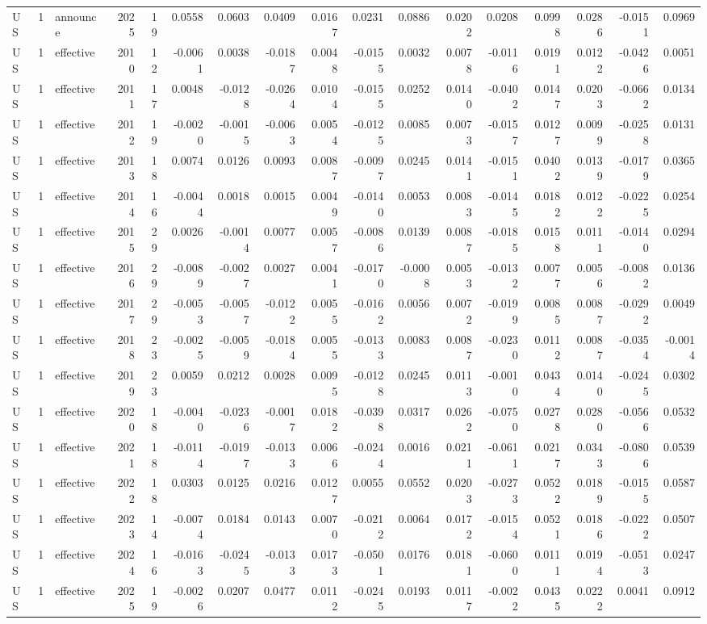 \begin{tabular}{lrlrrrrrrrrrrrrrr}
US & 1 & announce & 2025 & 19 & 0.0558 & 0.0603 & 0.0409 & 0.0167 & 0.0231 & 0.0886 & 0.0202 & 0.0208 & 0.0998 & 0.0286 & -0.0151 & 0.0969 \\
US & 1 & effective & 2010 & 12 & -0.0061 & 0.0038 & -0.0187 & 0.0048 & -0.0155 & 0.0032 & 0.0078 & -0.0116 & 0.0191 & 0.0122 & -0.0426 & 0.0051 \\
US & 1 & effective & 2011 & 17 & 0.0048 & -0.0128 & -0.0264 & 0.0104 & -0.0155 & 0.0252 & 0.0140 & -0.0402 & 0.0147 & 0.0203 & -0.0662 & 0.0134 \\
US & 1 & effective & 2012 & 19 & -0.0020 & -0.0015 & -0.0063 & 0.0054 & -0.0125 & 0.0085 & 0.0073 & -0.0157 & 0.0127 & 0.0099 & -0.0258 & 0.0131 \\
US & 1 & effective & 2013 & 18 & 0.0074 & 0.0126 & 0.0093 & 0.0087 & -0.0097 & 0.0245 & 0.0141 & -0.0151 & 0.0402 & 0.0139 & -0.0179 & 0.0365 \\
US & 1 & effective & 2014 & 16 & -0.0044 & 0.0018 & 0.0015 & 0.0049 & -0.0140 & 0.0053 & 0.0083 & -0.0145 & 0.0182 & 0.0122 & -0.0225 & 0.0254 \\
US & 1 & effective & 2015 & 29 & 0.0026 & -0.0014 & 0.0077 & 0.0057 & -0.0086 & 0.0139 & 0.0087 & -0.0185 & 0.0158 & 0.0111 & -0.0140 & 0.0294 \\
US & 1 & effective & 2016 & 29 & -0.0089 & -0.0027 & 0.0027 & 0.0041 & -0.0170 & -0.0008 & 0.0053 & -0.0132 & 0.0077 & 0.0056 & -0.0082 & 0.0136 \\
US & 1 & effective & 2017 & 29 & -0.0053 & -0.0057 & -0.0122 & 0.0055 & -0.0162 & 0.0056 & 0.0072 & -0.0199 & 0.0085 & 0.0087 & -0.0292 & 0.0049 \\
US & 1 & effective & 2018 & 23 & -0.0025 & -0.0059 & -0.0184 & 0.0055 & -0.0133 & 0.0083 & 0.0087 & -0.0230 & 0.0112 & 0.0087 & -0.0354 & -0.0014 \\
US & 1 & effective & 2019 & 23 & 0.0059 & 0.0212 & 0.0028 & 0.0095 & -0.0128 & 0.0245 & 0.0113 & -0.0010 & 0.0434 & 0.0140 & -0.0245 & 0.0302 \\
US & 1 & effective & 2020 & 18 & -0.0040 & -0.0236 & -0.0017 & 0.0182 & -0.0398 & 0.0317 & 0.0262 & -0.0750 & 0.0278 & 0.0280 & -0.0566 & 0.0532 \\
US & 1 & effective & 2021 & 18 & -0.0114 & -0.0197 & -0.0133 & 0.0066 & -0.0244 & 0.0016 & 0.0211 & -0.0611 & 0.0217 & 0.0343 & -0.0806 & 0.0539 \\
US & 1 & effective & 2022 & 18 & 0.0303 & 0.0125 & 0.0216 & 0.0127 & 0.0055 & 0.0552 & 0.0203 & -0.0273 & 0.0522 & 0.0189 & -0.0155 & 0.0587 \\
US & 1 & effective & 2023 & 14 & -0.0074 & 0.0184 & 0.0143 & 0.0070 & -0.0212 & 0.0064 & 0.0172 & -0.0154 & 0.0521 & 0.0186 & -0.0222 & 0.0507 \\
US & 1 & effective & 2024 & 16 & -0.0163 & -0.0245 & -0.0133 & 0.0173 & -0.0501 & 0.0176 & 0.0181 & -0.0600 & 0.0111 & 0.0194 & -0.0513 & 0.0247 \\
US & 1 & effective & 2025 & 19 & -0.0026 & 0.0207 & 0.0477 & 0.0112 & -0.0245 & 0.0193 & 0.0117 & -0.0022 & 0.0435 & 0.0222 & 0.0041 & 0.0912 \\
\bottomrule
\end{tabular}
